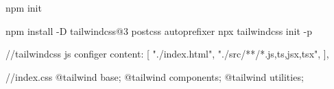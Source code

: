 npm init


npm install -D tailwindcss@3 postcss autoprefixer
npx tailwindcss init -p

//tailwindcss js configer
content: [
    "./index.html",
    "./src/**/*.{js,ts,jsx,tsx}",
  ],

//index.css
@tailwind base;
@tailwind components;
@tailwind utilities;